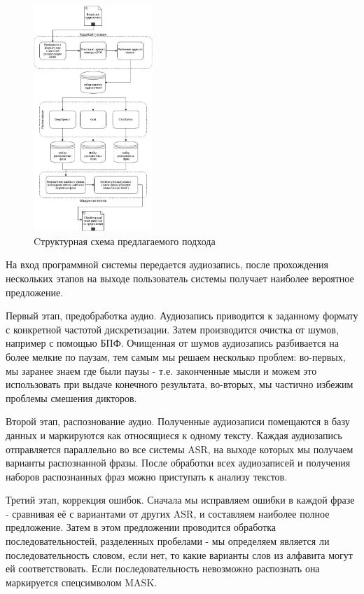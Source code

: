 \documentclass[conference]{IEEEtran}
\begin{document}
\begin{figure}[h]
\centering
\includegraphics[width=0.4\textwidth]{./Diagram1.jpg}
\caption{Cтруктурная схема предлагаемого подхода}
\label{fig:Panel}
\end{figure}

На вход программной системы передается аудиозапись, после прохождения нескольких этапов на выходе пользователь системы получает наиболее вероятное предложение.

Первый этап, предобработка аудио. Аудиозапись приводится к заданному формату с конкретной частотой дискретизации. Затем производится очистка от шумов, например с помощью БПФ. Очищенная от шумов аудиозапись разбивается на более мелкие по паузам, тем самым мы решаем несколько проблем: во-первых, мы заранее знаем где были паузы - т.е. законченные мысли и можем это использовать при выдаче конечного результата, во-вторых, мы частично избежим проблемы смешения дикторов.

Второй этап, распознование аудио. Полученные аудиозаписи помещаются в базу данных и маркируются как относящиеся к одному тексту. Каждая аудиозапись отправляется параллельно во все системы ASR, на выходе которых мы получаем варианты распознанной фразы. После обработки всех аудиозаписей и получения наборов распознанных фраз можно приступать к анализу текстов.

Третий этап, коррекция ошибок. Сначала мы исправляем ошибки в каждой фразе - сравнивая её с вариантами от других ASR, и составляем наиболее полное предложение. Затем в этом предложении проводится обработка последовательностей, разделенных пробелами - мы определяем является ли последовательность словом, если нет, то какие варианты слов из алфавита могут ей соответствовать. Если последовательность невозможно распознать она маркируется спецсимволом MASK.
\end{document}
